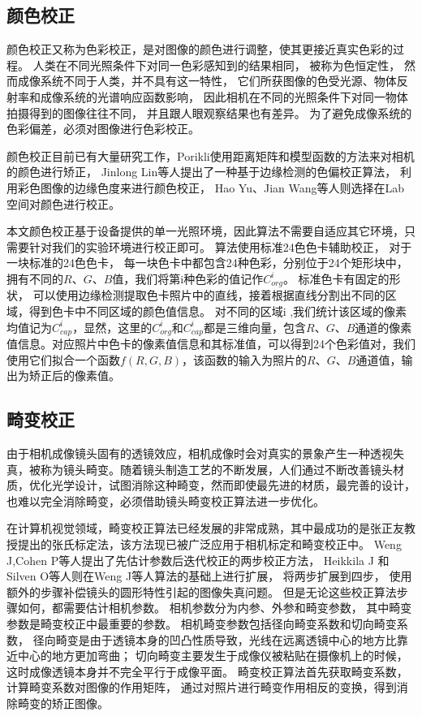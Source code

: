 \subsection{颜色校正}


颜色校正又称为色彩校正，是对图像的颜色进行调整，使其更接近真实色彩的过程。
人类在不同光照条件下对同一色彩感知到的结果相同，
被称为色恒定性，
然而成像系统不同于人类，并不具有这一特性，
它们所获图像的色受光源、物体反射率和成像系统的光谱响应函数影响，
因此相机在不同的光照条件下对同一物体拍摄得到的图像往往不同，
并且跟人眼观察结果也有差异。
为了避免成像系统的色彩偏差，必须对图像进行色彩校正。

颜色校正目前已有大量研究工作，Porikli\cite{weng2005novel}使用距离矩阵和模型函数的方法来对相机的颜色进行矫正，
Jinlong Lin\cite{porikli2003inter}等人提出了一种基于边缘检测的色偏校正算法，
利用彩色图像的边缘色度来进行颜色校正，
Hao Yu、Jian Wang\cite{yu2009color}等人则选择在Lab空间对颜色进行校正。

本文颜色校正基于设备提供的单一光照环境，因此算法不需要自适应其它环境，只需要针对我们的实验环境进行校正即可。
算法使用标准24色色卡辅助校正，
对于一块标准的24色色卡，
 每一块色卡中都包含24种色彩，分别位于24个矩形块中，拥有不同的$R$、$G$、$B$值，我们将第i种色彩的值记作$C_{org}^i$。
 标准色卡有固定的形状，
 可以使用边缘检测提取色卡照片中的直线，接着根据直线分割出不同的区域，得到色卡中不同区域的颜色值信息。
 对不同的区域i ,我们统计该区域的像素均值记为$C_{cap}^i$，显然，这里的$C_{org}^i$和$C_{cap}^i$都是三维向量，包含$R$、$G$、$B$通道的像素值信息。对应照片中色卡的像素值信息和其标准值，可以得到24个色彩值对，我们使用它们拟合一个函数$f(R,G,B)$，该函数的输入为照片的$R$、$G$、$B$通道值，输出为矫正后的像素值。


\subsection{畸变校正}

由于相机成像镜头固有的透镜效应，相机成像时会对真实的景象产生一种透视失真，被称为镜头畸变。随着镜头制造工艺的不断发展，人们通过不断改善镜头材质，优化光学设计，试图消除这种畸变，然而即使最先进的材质，最完善的设计，也难以完全消除畸变，必须借助镜头畸变校正算法进一步优化。

在计算机视觉领域，畸变校正算法已经发展的非常成熟，其中最成功的是张正友教授提出的张氏标定法\cite{zhang2000flexible}，该方法现已被广泛应用于相机标定和畸变校正中。
Weng J,Cohen P\cite{weng1992camera}等人提出了先估计参数后迭代校正的两步校正方法，
Heikkila J 和Silven O\cite{heikkila1997four}等人则在Weng J等人算法的基础上进行扩展，
将两步扩展到四步，
使用额外的步骤补偿镜头的圆形特性引起的图像失真问题。
但是无论这些校正算法步骤如何，都需要估计相机参数。
相机参数分为内参、外参和畸变参数，
其中畸变参数是畸变校正中最重要的参数。
相机畸变参数包括径向畸变系数和切向畸变系数，
径向畸变是由于透镜本身的凹凸性质导致，光线在远离透镜中心的地方比靠近中心的地方更加弯曲；
切向畸变主要发生于成像仪被粘贴在摄像机上的时候，
这时成像透镜本身并不完全平行于成像平面。
畸变校正算法首先获取畸变系数，计算畸变系数对图像的作用矩阵，
通过对照片进行畸变作用相反的变换，得到消除畸变的矫正图像。

